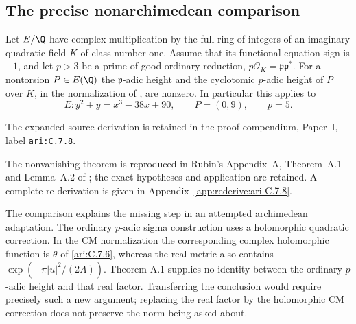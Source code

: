 \subsection{The precise nonarchimedean comparison}
\begin{cited}\label{ari:C.7.8}

Let $E/\Q$ have complex multiplication by the full ring of integers
of an imaginary quadratic field $K$ of class number one. Assume
that its functional-equation sign is $-1$, and let $p>3$ be a
prime of good ordinary reduction, $p\mathcal O_K=\mathfrak p
\mathfrak p^*$. For a nontorsion $P\in E(\Q)$ the
$\mathfrak p$-adic height and the cyclotomic $p$-adic height
of $P$ over $K$, in the normalization of
\citet[Appendix A]{agboola2006}, are nonzero.
In particular this applies to
\[
 E:y^2+y=x^3-38x+90,\qquad P=(0,9),\qquad p=5.
\]
\end{cited}
The expanded source derivation is retained in the proof compendium, Paper~I, label \nolinkurl{ari:C.7.8}.




The nonvanishing theorem is reproduced in Rubin's Appendix~A, Theorem~A.1 and Lemma~A.2 of \citet{agboola2006}; the exact hypotheses and application are retained. A complete re-derivation is given in Appendix~\ref{app:rederive:ari-C.7.8}.


The comparison explains the missing step in an attempted
archimedean adaptation. The ordinary $p$-adic sigma construction
uses a holomorphic quadratic correction. In the CM normalization
the corresponding complex holomorphic function is $\theta$
of \ref{ari:C.7.6}, whereas the real metric also contains
$\exp(-\pi|u|^2/(2A))$. Theorem A.1 supplies no identity
between the ordinary $p$-adic height and that real factor.
Transferring the conclusion would require precisely such a
new argument; replacing the real factor by the holomorphic
CM correction does not preserve the norm being asked about.

